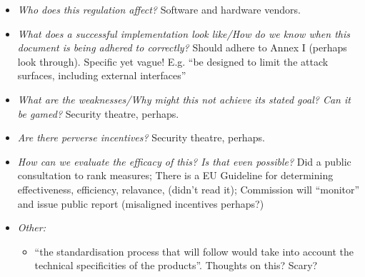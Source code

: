 \documentclass[11pt]{article}
\begin{document}
\begin{itemize}
    \item {\it Who does this regulation affect?} Software and hardware vendors. 
    \item {\it What does a successful implementation look like/How do we know when this document is being adhered to correctly?} Should adhere to Annex I (perhaps look through). Specific yet vague! E.g. ``be designed to limit the attack surfaces, including external interfaces''
    \item {\it What are the weaknesses/Why might this not achieve its stated goal? Can it be gamed?} Security theatre, perhaps.
    \item {\it Are there perverse incentives?} Security theatre, perhaps.
    \item {\it How can we evaluate the efficacy of this? Is that even possible?} Did a public consultation to rank measures; There is a EU Guideline for determining effectiveness, efficiency, relavance, (didn't read it); Commission will ``monitor'' and issue public report (misaligned incentives perhaps?)
    \item {\it Other:}
    \begin{itemize}
        \item ``the standardisation process that will follow would take into account the technical specificities of the products''. Thoughts on this? Scary?
    \end{itemize}
\end{itemize}


\end{document}
